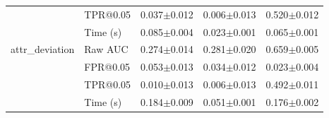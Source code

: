 \begin{tabular}{llccc}
 & TPR@0.05 & 0.037$\pm$0.012 & 0.006$\pm$0.013 & 0.520$\pm$0.012 \\
 & Time (s) & 0.085$\pm$0.004 & 0.023$\pm$0.001 & 0.065$\pm$0.001 \\
\midrule
attr\_deviation & Raw AUC & 0.274$\pm$0.014 & 0.281$\pm$0.020 & 0.659$\pm$0.005 \\
 & FPR@0.05 & 0.053$\pm$0.013 & 0.034$\pm$0.012 & 0.023$\pm$0.004 \\
 & TPR@0.05 & 0.010$\pm$0.013 & 0.006$\pm$0.013 & 0.492$\pm$0.011 \\
 & Time (s) & 0.184$\pm$0.009 & 0.051$\pm$0.001 & 0.176$\pm$0.002 \\
\bottomrule
\end{tabular}
